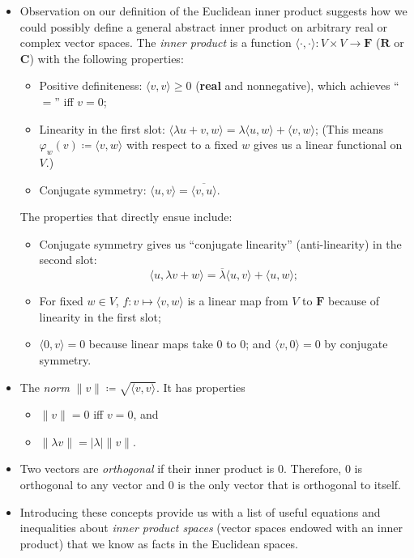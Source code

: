 \documentclass[11pt]{article}
\newcommand{\df}[1]{\textit{\textsf{#1}}}
\newcommand{\R}{\mathbf{R}}
\newcommand{\C}{\mathbf{C}}
\newcommand{\F}{\mathbf{F}}
\newcommand{\conj}[1]{\overline{#1}}
\newcommand{\inp}[2]{\langle #1, #2 \rangle}
\renewcommand{\phi}{\varphi}
\begin{document}
\begin{itemize}
    \item Observation on our definition of the Euclidean inner product suggests how we could possibly define a general abstract inner product on arbitrary real or complex vector spaces. The \df{inner product} is a function $\inp{\cdot}{\cdot}: V \times V \to \F$ ($\R$ or $\C$) with the following properties:
    \begin{itemize}
        \item Positive definiteness: $\inp{v}{v} \geq 0$ (\textbf{real} and nonnegative), which achieves ``$=$'' iff $v = 0$;
        \item Linearity in the first slot: $\inp{\lambda u+v}{w} = \lambda \inp{u}{w} + \inp{v}{w}$; (This means $\phi_w(v) \coloneqq \inp{v}{w}$ with respect to a fixed $w$ gives us a linear functional on $V$.)
        \item Conjugate symmetry: $\inp{u}{v} = \conj{\inp{v}{u}}$.
    \end{itemize}
    The properties that directly ensue include:
    \begin{itemize}
        \item Conjugate symmetry gives us ``conjugate linearity'' (anti-linearity) in the second slot: $$\inp{u}{\lambda v+w} = \conj{\lambda} \inp{u}{v} + \inp{u}{w};$$
        \item For fixed $w \in V$, $f: v \mapsto \inp{v}{w}$ is a linear map from $V$ to $\F$ because of linearity in the first slot;
        \item $\inp{0}{v} = 0$ because linear maps take 0 to 0; and $\inp{v}{0} = 0$ by conjugate symmetry.
    \end{itemize}
    \item The \df{norm} $\|v\| \coloneqq \sqrt{\inp{v}{v}}.$ It has properties
    \begin{itemize}
        \item $\|v\| = 0$ iff $v = 0$, and 
        \item $\|\lambda v\| = |\lambda| \|v\|$.
    \end{itemize}
    \item Two vectors are \df{orthogonal} if their inner product is 0. Therefore, 0 is orthogonal to any vector and 0 is the only vector that is orthogonal to itself.
    \item Introducing these concepts provide us with a list of useful equations and inequalities about \df{inner product spaces} (vector spaces endowed with an inner product) that we know as facts in the Euclidean spaces.
    \begin{itemize}

\end{itemize}
\end{itemize}
\end{document}

